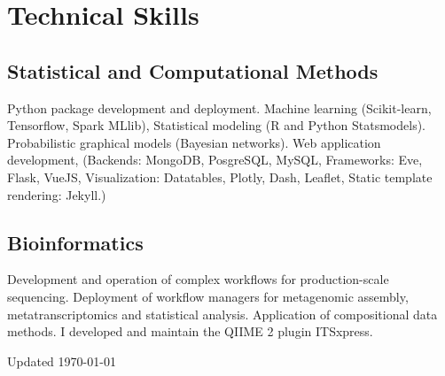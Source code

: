 \documentclass[12pt,letterpaper]{report}
\newcommand{\listitemspace}{0.15em}
\renewenvironment{itemize}
{\begin{list}{}{\setlength{\leftmargin}{0em}
            \setlength{\parskip}{0em}
            \setlength{\itemsep}{\listitemspace}
            \setlength{\parsep}{\listitemspace}}}
    {\end{list}}
\begin{document}
    \section*{Technical Skills}

    \subsection*{Statistical and Computational Methods}

    \begin{itemize}

        \item Python package development and deployment. Machine learning (Scikit-learn, Tensorflow, Spark MLlib), Statistical modeling (R and Python Statsmodels). Probabilistic graphical models (Bayesian networks). Web application development, (Backends: MongoDB, PosgreSQL, MySQL, Frameworks: Eve, Flask, VueJS, Visualization: Datatables, Plotly, Dash, Leaflet, Static template rendering: Jekyll.)
        

    \end{itemize}

    \subsection*{Bioinformatics}

    \begin{itemize}

        \item Development and operation of complex workflows for production-scale sequencing. Deployment of workflow managers for metagenomic assembly, metatranscriptomics and statistical analysis. Application of compositional data methods. I developed and maintain the QIIME 2 plugin ITSxpress.

    \end{itemize}



    \begin{center}
        \vspace{6em}
        \vfill
        Updated \monthyeardate\today
    \end{center}
\end{document}
